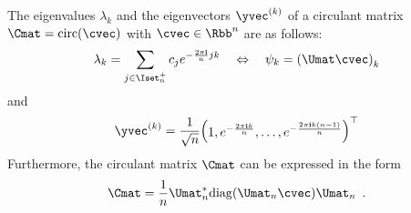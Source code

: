 \begin{theorem} \label{theorem:ch2-diagonalization_circulant_matrix}
  The eigenvalues $\lambda_k$ and the eigenvectors $\yvec^{(k)}$ of a circulant matrix $\Cmat = \circulant(\cvec)$ with $\cvec \in \Rbb^n$ are as follows:
  \begin{equation}
    \lambda_k = \sum_{j \in \Iset^+_n} c_j e^{-\frac{2 \pi \ci}{n} jk} \quad \Leftrightarrow \quad \psi_k = \left( \Umat \cvec \right)_k
  \end{equation}
  and
  \begin{equation}
    \yvec^{(k)} = \frac{1}{\sqrt{n}} \leftmatrix 1, e^{-\frac{2 \pi \ci k}{n}}, \dots, e^{-\frac{2 \pi \ci k(n-1)}{n}} \rightmatrix^\top
  \end{equation}
  Furthermore, the circulant matrix $\Cmat$ can be expressed in the form 
  \begin{equation} \label{equation:ch2-diagonalization_circulant_matrix}
    \Cmat = \frac{1}{n} \Umat_n^* \diag(\Umat_n \cvec) \Umat_n \enspace.
  \end{equation}
\end{theorem}


\begingroup
\allowdisplaybreaks


